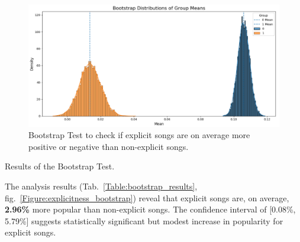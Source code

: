 \begin{center}
\begin{figure}[H]
  \centering
  \includegraphics[width=6in]{img/explicitness_bootstrap_2.png}
  \caption{Bootstrap Test to check if explicit songs are on average more
  positive or negative than non-explicit songs.}
  \label{Figure:explicitness_bootstrap_2}
\end{figure}
\end{center}



\begin{table}[H]
\centering
\caption{Results of the Bootstrap Test.}
\label{Table:bootstrap_results}
\end{table}

The analysis results (Tab.~\ref{Table:bootstrap_results},
fig.~\ref{Figure:explicitness_bootstrap}) reveal that explicit songs are, on
average, \textbf{2.96\%} more popular than non-explicit songs. The confidence
interval of [0.08\%, 5.79\%] suggests statistically significant but modest
increase in popularity for explicit songs.


